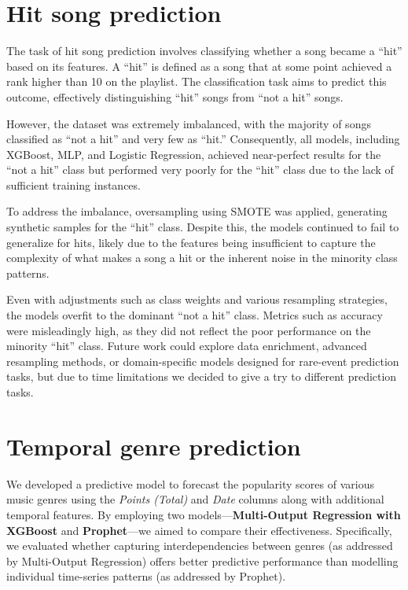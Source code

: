 \documentclass{article}
\begin{document}
\section{Hit song prediction}
\label{appendix:hit_song}

The task of hit song prediction involves classifying whether a song became a ``hit'' based on its features. A ``hit'' is defined as a song that at some point achieved a rank higher than 10 on the playlist. The classification task aims to predict this outcome, effectively distinguishing ``hit'' songs from ``not a hit'' songs.

However, the dataset was extremely imbalanced, with the majority of songs classified as ``not a hit'' and very few as ``hit.'' Consequently, all models, including XGBoost, MLP, and Logistic Regression, achieved near-perfect results for the ``not a hit'' class but performed very poorly for the ``hit'' class due to the lack of sufficient training instances.

To address the imbalance, oversampling using SMOTE was applied, generating synthetic samples for the ``hit'' class. Despite this, the models continued to fail to generalize for hits, likely due to the features being insufficient to capture the complexity of what makes a song a hit or the inherent noise in the minority class patterns.

Even with adjustments such as class weights and various resampling strategies, the models overfit to the dominant ``not a hit'' class. Metrics such as accuracy were misleadingly high, as they did not reflect the poor performance on the minority ``hit'' class. Future work could explore data enrichment, advanced resampling methods, or domain-specific models designed for rare-event prediction tasks, but due to time limitations we decided to give a try to different prediction tasks.



\section{Temporal genre prediction}
\label{appendix:temporal_genre_prediction}
We developed a predictive model to forecast the popularity scores of various music genres using the \textit{Points (Total)} and \textit{Date} columns along with additional temporal features. By employing two models—\textbf{Multi-Output Regression with XGBoost} and \textbf{Prophet}—we aimed to compare their effectiveness. Specifically, we evaluated whether capturing interdependencies between genres (as addressed by Multi-Output Regression) offers better predictive performance than modelling individual time-series patterns (as addressed by Prophet).
\end{document}
